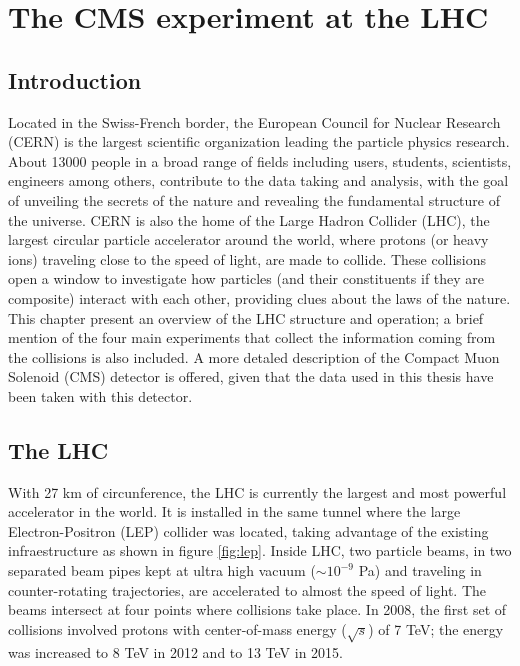 \chapter{The CMS experiment at the LHC}\label{ch:cms}

\section{Introduction}\label{sec:cms_intro}
\noindent Located in the Swiss-French border, the European Council for Nuclear Research (CERN) is the largest scientific organization leading the particle physics research. About 13000 people in a broad range of fields including users, students, scientists, engineers among others, contribute to the data taking and analysis, with the goal of unveiling the secrets of the nature and revealing the fundamental structure of the universe. CERN is also the home of the Large Hadron Collider (LHC), the largest circular particle accelerator around the world, where protons (or heavy ions) traveling close to the speed of light, are made to collide. These collisions open a window to investigate how particles (and their constituents if they are composite) interact with each other, providing clues about the laws of the nature. This chapter present an overview of the LHC structure and operation; a brief mention of the four main experiments that collect the information coming from the collisions is also included. A more detaled description of the Compact Muon Solenoid (CMS) detector is offered, given that the data used in this thesis have been taken with this detector.     

\section{The LHC}

\noindent With 27 km of circunference, the LHC is currently the largest and most powerful accelerator in the world. It is installed in the same tunnel where the large Electron-Positron (LEP) collider was located, taking advantage of the existing infraestructure as shown in figure \ref{fig:lep}. Inside LHC, two particle beams, in two separated beam pipes kept at ultra high vacuum ($\sim 10^{-9}$ Pa) and traveling in counter-rotating trajectories, are accelerated to almost the speed of light. The beams intersect at four points where collisions take place. In 2008, the first set of collisions involved protons with center-of-mass energy ($\sqrt{s}$) of 7 TeV; the energy was increased to 8 TeV in 2012 and to 13 TeV in 2015.

